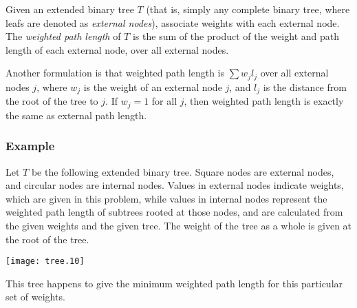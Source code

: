 \documentclass[12pt]{article}
\begin{document}
Given an extended binary tree $T$ (that is, simply any complete binary tree, where leafs are denoted as \emph{external nodes}), associate weights with each external node.  The \emph{weighted path length} of $T$ is the sum of the product of the weight and path length of each external node, over all external nodes.

Another formulation is that weighted path length is $\sum w_jl_j$ over all external nodes $j$, where $w_j$ is the weight of an external node $j$, and $l_j$ is the distance from the root of the tree to $j$.  If $w_j = 1$ for all $j$, then weighted path length is exactly the same as external path length.

\subsubsection*{Example}

Let $T$ be the following extended binary tree.  Square nodes are external nodes, and circular nodes are internal nodes.  Values in external nodes indicate weights, which are given in this problem, while values in internal nodes represent the weighted path length of subtrees rooted at those nodes, and are calculated from the given weights and the given tree.  The weight of the tree as a whole is given at the root of the tree.

\begin{center}
\texttt{[image: tree.10]}
\end{center}

This tree happens to give the minimum weighted path length for this particular set of weights.
\end{document}
